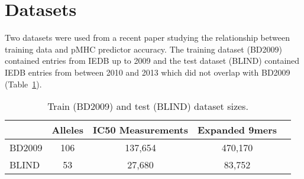 \section{Datasets}

Two datasets were used from a recent paper studying the relationship between training data and pMHC predictor accuracy\cite{Kim_2014}. The training dataset (BD2009) contained entries from IEDB\cite{Salimi_2012} up to 2009 and the test dataset (BLIND) contained IEDB entries from between 2010 and 2013 which did not overlap with BD2009 (Table~\ref{tab:datasets}).

\begin{table}[h!]
\centering
\begin{tabular}{l||cccc}
\toprule
{} & Alleles &  IC50 Measurements & Expanded 9mers \\
\midrule
BD2009 &     106 &                           137,654 &        470,170 \\
BLIND  &      53 &                           27,680 &         83,752 \\
\bottomrule
\end{tabular}
\caption{Train (BD2009) and test (BLIND) dataset sizes.}
\label{tab:datasets}
\end{table}
